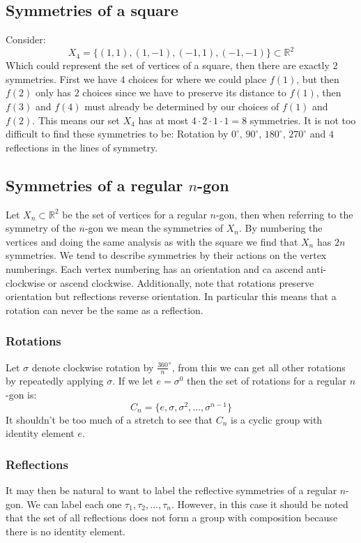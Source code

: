 \documentclass[12pt]{article}
\begin{document}
\subsection*{Symmetries of a square}
Consider:
\[X_4=\{(1,1),(1,-1),(-1,1),(-1,-1)\}\subset \mathbb{R}^2\]
Which could represent the set of vertices of a square, then there are exactly \(2\) symmetries. First we have 4 choices for where we could place \(f(1)\), but then \(f(2)\) only has \(2\) choices since we have to preserve its distance to \(f(1)\), then \(f(3)\) and \(f(4)\) must already be determined by our choices of \(f(1)\) and \(f(2)\). This means our set \(X_4\) has at most \(4\cdot2\cdot1\cdot1=8\) symmetries. It is not too difficult to find these symmetries to be: Rotation by \(0^\circ,\,90^\circ,\,180^\circ,\,270^\circ\) and \(4\) reflections in the lines of symmetry.
\subsection*{Symmetries of a regular \(n\)-gon}
Let \(X_n\subset\mathbb{R}^2\) be the set of vertices for a regular \(n\)-gon, then when referring to the symmetry of the \(n\)-gon we mean the symmetries of \(X_n\). By numbering the vertices and doing the same analysis as with the square we find that \(X_n\) has \(2n\) symmetries. We tend to describe symmetries by their actions on the vertex numberings. Each vertex numbering has an orientation and ca ascend anti-clockwise or ascend clockwise. Additionally, note that rotations preserve orientation but reflections reverse orientation. In particular this means that a rotation can never be the same as a reflection. 
\subsubsection*{Rotations}
Let \(\sigma\) denote clockwise rotation by \(\frac{360}{n}^\circ\), from this we can get all other rotations by repeatedly applying \(\sigma\). If we let \(e=\sigma^0\) then the set of rotations for a regular \(n\)-gon is:
\[C_n=\{e,\sigma,\sigma^2,\dots,\sigma^{n-1}\}\]
It shouldn't be too much of a stretch to see that \(C_n\) is a cyclic group with identity element \(e\).
\subsubsection*{Reflections}
It may then be natural to want to label the reflective symmetries of a regular \(n\)-gon. We can label each one \(\tau_1,\tau_2,\dots,\tau_n\). However, in this case it should be noted that the set of all reflections does not form a group with composition because there is no identity element.
\end{document}
